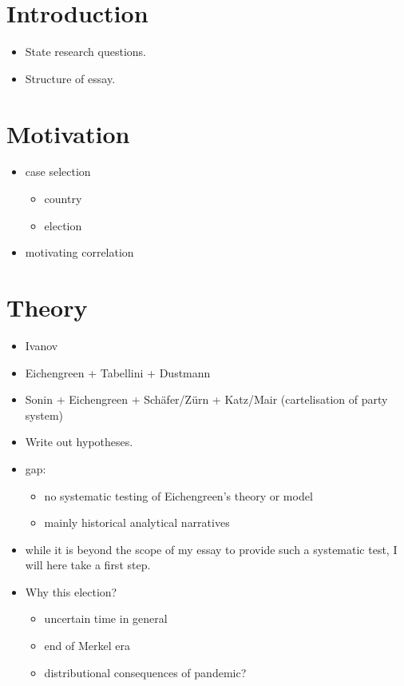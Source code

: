 \documentclass[
]{article}
\providecommand{\tightlist}{%
  \setlength{\itemsep}{0pt}\setlength{\parskip}{0pt}}
\begin{document}
\hypertarget{introduction}{%
\section{Introduction}\label{introduction}}

\begin{itemize}
\item
  State research questions.
\item
  Structure of essay.
\end{itemize}

\hypertarget{motivation}{%
\section{Motivation}\label{motivation}}

\begin{itemize}
\tightlist
\item
  case selection

  \begin{itemize}
  \tightlist
  \item
    country
  \item
    election
  \end{itemize}
\item
  motivating correlation
\end{itemize}

\hypertarget{theory}{%
\section{Theory}\label{theory}}

\begin{itemize}
\item
  Ivanov
\item
  Eichengreen + Tabellini + Dustmann
\item
  Sonin + Eichengreen + Schäfer/Zürn + Katz/Mair (cartelisation of party
  system)
\item
  Write out hypotheses.
\item
  gap:

  \begin{itemize}
  \tightlist
  \item
    no systematic testing of Eichengreen's theory or model
  \item
    mainly historical analytical narratives
  \end{itemize}
\item
  while it is beyond the scope of my essay to provide such a systematic
  test, I will here take a first step.
\item
  Why this election?

  \begin{itemize}
  \tightlist
  \item
    uncertain time in general
  \item
    end of Merkel era
  \item
    distributional consequences of pandemic?
  \end{itemize}
\end{itemize}
\end{document}
